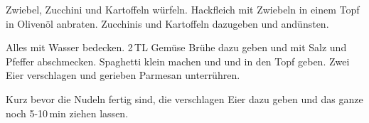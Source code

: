 \begin{Notes}
\item Zwiebel, Zucchini und Kartoffeln würfeln. Hackfleich mit Zwiebeln in einem Topf in Olivenöl anbraten. Zucchinis und Kartoffeln dazugeben und andünsten.

\item Alles mit Wasser bedecken. 2\,TL Gemüse Brühe dazu geben und mit Salz und Pfeffer abschmecken. Spaghetti klein machen und und in den Topf geben. Zwei Eier verschlagen und gerieben Parmesan unterrühren.

\item Kurz bevor die Nudeln fertig sind, die verschlagen Eier dazu geben und das ganze noch 5-10\,min ziehen lassen. 
\end{Notes}


